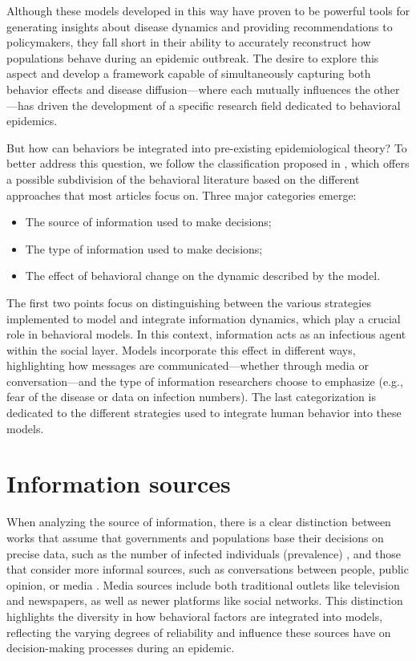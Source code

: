 Although these models developed in this way have proven to be powerful tools for generating insights about disease dynamics and providing recommendations to policymakers, they fall short in their ability to accurately reconstruct how populations behave during an epidemic outbreak. The desire to explore this aspect and develop a framework capable of simultaneously capturing both behavior effects and disease diffusion—where each mutually influences the other—has driven the development of a specific research field dedicated to behavioral epidemics.

But how can behaviors be integrated into pre-existing epidemiological theory? To better address this question, we follow the classification proposed in \cite{Funk_2010}, which offers a possible subdivision of the behavioral literature based on the different approaches that most articles focus on. Three major categories emerge:
\begin{itemize}
	\item The source of information used to make decisions;
	\item The type of information used to make decisions;
	\item The effect of behavioral change on the dynamic described by  the model. 
\end{itemize}


The first two points focus on distinguishing between the various strategies implemented to model and integrate information dynamics, which play a crucial role in behavioral models. In this context, information acts as an infectious agent within the social layer. Models incorporate this effect in different ways, highlighting how messages are communicated—whether through media or conversation—and the type of information researchers choose to emphasize (e.g., fear of the disease or data on infection numbers). The last categorization is dedicated to the different strategies used to integrate human behavior into these models.
\section{Information sources}
When analyzing the source of information, there is a clear distinction between works \cite{Vogiatzis2010} that assume that governments and populations base their decisions on precise data, such as the number of infected individuals (prevalence) \cite{Collinson2014, Tyson_2020}, and those that consider more informal sources, such as conversations between people, public opinion, or media \cite{Bulai2023, Sontag2022}. Media sources include both traditional outlets like television and newspapers, as well as newer platforms like social networks.
This distinction highlights the diversity in how behavioral factors are integrated into models, reflecting the varying degrees of reliability and influence these sources have on decision-making processes during an epidemic.

